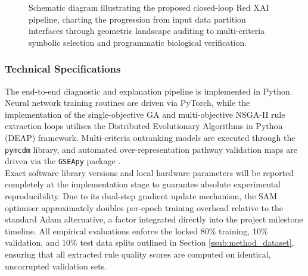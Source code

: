 \begin{figure}[H]
\caption{Schematic diagram illustrating the proposed closed-loop Red XAI pipeline, charting the 
progression from input data partition interfaces through geometric landscape auditing to multi-criteria 
symbolic selection and programmatic biological verification.}
\label{fig:audit_pipeline_loop}
\end{figure}

\subsubsection{Technical Specifications}
\label{ssub:method_tech_specification}
The end-to-end diagnostic and explanation pipeline is implemented in Python. 
Neural network training routines are driven via PyTorch, while the implementation of 
the single-objective GA and multi-objective NSGA-II rule extraction loops utilises 
the Distributed Evolutionary Algorithms in Python (DEAP) framework. Multi-criteria outranking 
models are executed through the \texttt{pymcdm} library, and automated over-representation 
pathway validation maps are driven via the \texttt{GSEApy} package \cite{Fang2023}. 
\\
Exact software library versions and local hardware parameters will be reported completely at 
the implementation stage to guarantee absolute experimental reproducibility. Due to its dual-step 
gradient update mechanism, the SAM optimiser approximately doubles per-epoch training 
overhead relative to the standard Adam alternative, a factor integrated directly into the 
project milestone timeline. All empirical evaluations enforce the locked 80\% training, 10\% 
validation, and 10\% test data splits outlined in Section \ref{ssub:method_dataset}, 
ensuring that all extracted rule quality scores are computed on identical, uncorrupted validation sets.